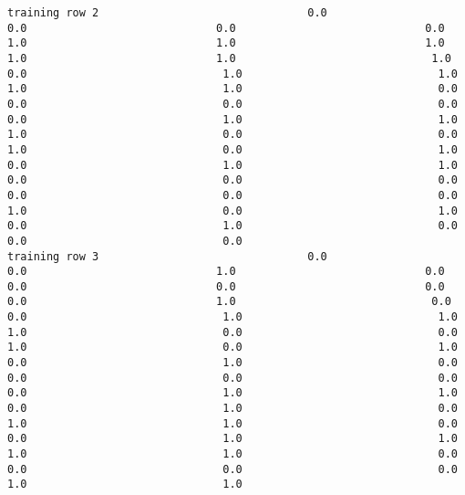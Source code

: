 \documentclass[11pt]{article}
\begin{document}
\begin{verbatim}
training row 2                                0.0                             0.0                             0.0                             0.0                             1.0                             1.0                             1.0                             1.0                             1.0                              1.0                              0.0                              1.0                              1.0                              1.0                              1.0                              0.0                              0.0                              0.0                              0.0                              0.0                              1.0                              1.0                              1.0                              0.0                              0.0                              1.0                              0.0                              1.0                              0.0                              1.0                              1.0                              0.0                              0.0                              0.0                              0.0                              0.0                              0.0                              1.0                              0.0                              1.0                              0.0                              1.0                              0.0                              0.0                              0.0
training row 3                                0.0                             0.0                             1.0                             0.0                             0.0                             0.0                             0.0                             0.0                             1.0                              0.0                              0.0                              1.0                              1.0                              1.0                              0.0                              0.0                              1.0                              0.0                              1.0                              0.0                              1.0                              0.0                              0.0                              0.0                              0.0                              0.0                              1.0                              1.0                              0.0                              1.0                              0.0                              1.0                              1.0                              0.0                              0.0                              1.0                              1.0                              1.0                              1.0                              0.0                              0.0                              0.0                              0.0                              1.0                              1.0

\end{verbatim}
\end{document}
